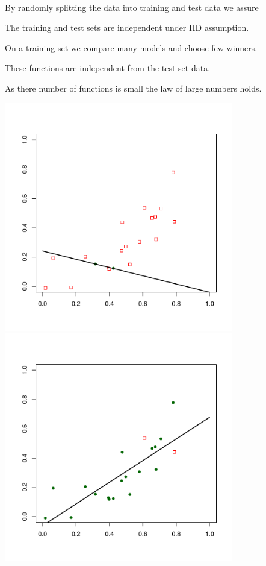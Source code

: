 \documentclass[landscape,footrule]{foils}
\begin{document}


\

By randomly splitting the data into training and test data we assure
\begin{triangles}
\item The training and test sets are independent under IID assumption.
\item On a training set we compare many models and  choose few winners. 
\item These functions are independent from the test set data.
\item As there number of functions is small the law of large numbers holds. 
\end{triangles}



\begin{center}
\includegraphics[width=10cm]{sample-split-1}\hspace*{1cm}
\includegraphics[width=10cm]{sample-split-2}
\end{center}
\vspace{-1cm}
\end{document}
